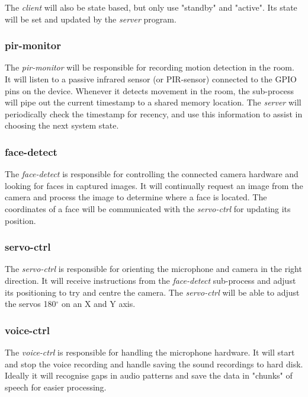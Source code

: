 \documentclass[11pt,a4paper,titlepage]{report}
\begin{document}
The \textit{client} will also be state based, but only use "standby" and "active". Its state will be set and updated by the \textit{server} program.


\subsubsection{pir-monitor}

The \textit{pir-monitor} will be responsible for recording motion detection in the room. It will listen to a passive infrared sensor (or PIR-sensor) connected to the GPIO pins on the device. Whenever it detects movement in the room, the sub-process will pipe out the current timestamp to a shared memory location. The \textit{server} will periodically check the timestamp for recency, and use this information to assist in choosing the next system state.


\subsubsection{face-detect}

The \textit{face-detect} is responsible for controlling the connected camera hardware and looking for faces in captured images. It will continually request an image from the camera and process the image to determine where a face is located. The coordinates of a face will be communicated with the \textit{servo-ctrl} for updating its position.


\subsubsection{servo-ctrl}

The \textit{servo-ctrl} is responsible for orienting the microphone and camera in the right direction. It will receive instructions from the \textit{face-detect} sub-process and adjust its positioning to try and centre the camera. The \textit{servo-ctrl} will be able to adjust the servos 180$^\circ$ on an X and Y axis.


\subsubsection{voice-ctrl}

The \textit{voice-ctrl} is responsible for handling the microphone hardware. It will start and stop the voice recording and handle saving the sound recordings to hard disk. Ideally it will recognise gaps in audio patterns and save the data in "chunks" of speech for easier processing. 
\end{document}
